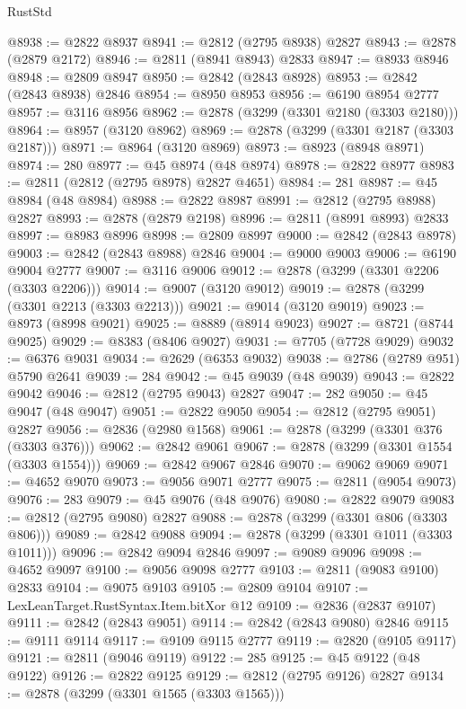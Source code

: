 \begin{lexlean}{RustStd}
\begin{coremodule}
{\begin{coremodule}
{{{{{{{{{{{{{{{{{{{{{{{{{{{{{{{{{@8938 := @2822 @8937
@8941 := @2812 (@2795 @8938) @2827
@8943 := @2878 (@2879 @2172)
@8946 := @2811 (@8941 @8943) @2833
@8947 := @8933 @8946
@8948 := @2809 @8947
@8950 := @2842 (@2843 @8928)
@8953 := @2842 (@2843 @8938) @2846
@8954 := @8950 @8953
@8956 := @6190 @8954 @2777
@8957 := @3116 @8956
@8962 := @2878 (@3299 (@3301 @2180 (@3303 @2180)))
@8964 := @8957 (@3120 @8962)
@8969 := @2878 (@3299 (@3301 @2187 (@3303 @2187)))
@8971 := @8964 (@3120 @8969)
@8973 := @8923 (@8948 @8971)
@8974 := 280
@8977 := @45 @8974 (@48 @8974)
@8978 := @2822 @8977
@8983 := @2811 (@2812 (@2795 @8978) @2827 @4651)
@8984 := 281
@8987 := @45 @8984 (@48 @8984)
@8988 := @2822 @8987
@8991 := @2812 (@2795 @8988) @2827
@8993 := @2878 (@2879 @2198)
@8996 := @2811 (@8991 @8993) @2833
@8997 := @8983 @8996
@8998 := @2809 @8997
@9000 := @2842 (@2843 @8978)
@9003 := @2842 (@2843 @8988) @2846
@9004 := @9000 @9003
@9006 := @6190 @9004 @2777
@9007 := @3116 @9006
@9012 := @2878 (@3299 (@3301 @2206 (@3303 @2206)))
@9014 := @9007 (@3120 @9012)
@9019 := @2878 (@3299 (@3301 @2213 (@3303 @2213)))
@9021 := @9014 (@3120 @9019)
@9023 := @8973 (@8998 @9021)
@9025 := @8889 (@8914 @9023)
@9027 := @8721 (@8744 @9025)
@9029 := @8383 (@8406 @9027)
@9031 := @7705 (@7728 @9029)
@9032 := @6376 @9031
@9034 := @2629 (@6353 @9032)
@9038 := @2786 (@2789 @951) @5790 @2641
@9039 := 284
@9042 := @45 @9039 (@48 @9039)
@9043 := @2822 @9042
@9046 := @2812 (@2795 @9043) @2827
@9047 := 282
@9050 := @45 @9047 (@48 @9047)
@9051 := @2822 @9050
@9054 := @2812 (@2795 @9051) @2827
@9056 := @2836 (@2980 @1568)
@9061 := @2878 (@3299 (@3301 @376 (@3303 @376)))
@9062 := @2842 @9061
@9067 := @2878 (@3299 (@3301 @1554 (@3303 @1554)))
@9069 := @2842 @9067 @2846
@9070 := @9062 @9069
@9071 := @4652 @9070
@9073 := @9056 @9071 @2777
@9075 := @2811 (@9054 @9073)
@9076 := 283
@9079 := @45 @9076 (@48 @9076)
@9080 := @2822 @9079
@9083 := @2812 (@2795 @9080) @2827
@9088 := @2878 (@3299 (@3301 @806 (@3303 @806)))
@9089 := @2842 @9088
@9094 := @2878 (@3299 (@3301 @1011 (@3303 @1011)))
@9096 := @2842 @9094 @2846
@9097 := @9089 @9096
@9098 := @4652 @9097
@9100 := @9056 @9098 @2777
@9103 := @2811 (@9083 @9100) @2833
@9104 := @9075 @9103
@9105 := @2809 @9104
@9107 := LexLeanTarget.RustSyntax.Item.bitXor @12
@9109 := @2836 (@2837 @9107)
@9111 := @2842 (@2843 @9051)
@9114 := @2842 (@2843 @9080) @2846
@9115 := @9111 @9114
@9117 := @9109 @9115 @2777
@9119 := @2820 (@9105 @9117)
@9121 := @2811 (@9046 @9119)
@9122 := 285
@9125 := @45 @9122 (@48 @9122)
@9126 := @2822 @9125
@9129 := @2812 (@2795 @9126) @2827
@9134 := @2878 (@3299 (@3301 @1565 (@3303 @1565)))
}}}}}}}}}}}}}}}}}}}}}}}}}}}}}}}}}
\end{coremodule}}
\end{coremodule}
\end{lexlean}
